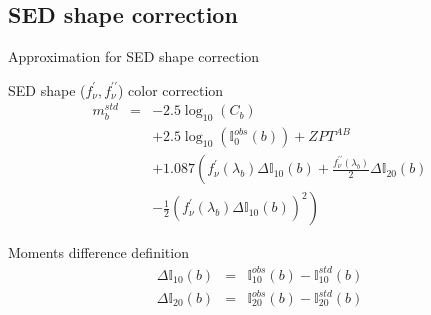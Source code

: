 \documentclass{beamer}
\begin{document}
\subsection{SED shape correction}
\begin{frame}{Approximation for SED shape correction}
\begin{alertblock}{SED shape ($f^\prime_\nu,f^{\prime\prime}_\nu$) color correction}
\begin{eqnarray}
m_b^{std} & = & -2.5 \log_{10}(C_b)  \nonumber \\
          &   &  + 2.5 \log_{10}(\mathbb{I}_0^{obs}(b)) + ZPT^{AB}  \nonumber \\
          &   &  + 1.087\left( f_\nu^\prime(\lambda_b) \Delta \mathbb{I}_{10}(b) +
          \frac{f_\nu^{\prime\prime}(\lambda_b)}{2}\Delta \mathbb{I}_{20}(b) \right. \nonumber \\
         & & - \left. \frac{1}{2}\left( f_\nu^\prime(\lambda_b) \Delta \mathbb{I}_{10}(b) \right)^2             
          \right)
\end{eqnarray}
\end{alertblock}
\begin{block}{Moments difference definition}
\begin{eqnarray}
\Delta \mathbb{I}_{10}(b) & = &  \mathbb{I}_{10}^{obs}(b)  -  \mathbb{I}_{10}^{std}(b) \\
\Delta \mathbb{I}_{20}(b) & = &   \mathbb{I}_{20}^{obs}(b)  -  \mathbb{I}_{20}^{std}(b) 
\end{eqnarray}
\end{block}
\end{frame}
\end{document}
